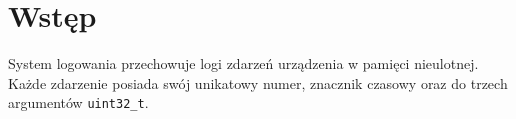 \section{Wstęp}
\label{Sec_Wstep}

System logowania przechowuje logi zdarzeń urządzenia w pamięci nieulotnej. Każde zdarzenie posiada swój unikatowy numer, znacznik czasowy oraz do trzech argumentów \texttt{uint32\_t}.